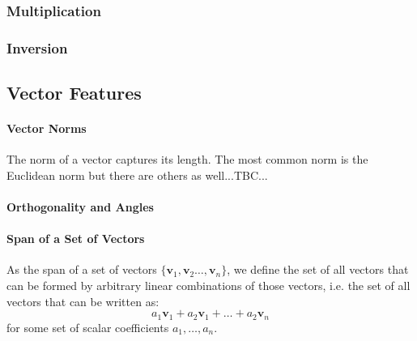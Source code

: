 \subsubsection{Multiplication}


\subsubsection{Inversion}



\subsection{Vector Features}

\paragraph{Vector Norms}
The norm of a vector captures its length. The most common norm is the Euclidean norm but there are others as well...TBC...


\paragraph{Orthogonality and Angles}
% 


\paragraph{Span of a Set of Vectors}
As the span of a set of vectors $\{\mathbf{v}_1, \mathbf{v}_2 \ldots, \mathbf{v}_n \}$, we define the set of all vectors that can be formed by arbitrary linear combinations of those vectors, i.e. the set of all vectors that can be written as:
\begin{equation}
 a_1 \mathbf{v}_1 + a_2 \mathbf{v}_1  + \ldots + a_2 \mathbf{v}_n 
\end{equation}
for some set of scalar coefficients $a_1, \ldots, a_n$.


